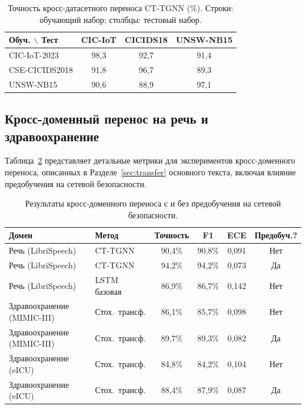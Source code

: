 \begin{table}[htbp]
\centering
\caption{Точность кросс-датасетного переноса CT-TGNN (\%). Строки: обучающий набор; столбцы: тестовый набор.}
\label{tab:app_transfer}
\begin{tabular}{lccc}
\toprule
Обуч. $\backslash$ Тест & CIC-IoT & CICIDS18 & UNSW-NB15 \\
\midrule
CIC-IoT-2023   & 98,3 & 92,7 & 91,4 \\
CSE-CICIDS2018 & 91,8 & 96,7 & 89,3 \\
UNSW-NB15      & 90,6 & 88,9 & 97,1 \\
\bottomrule
\end{tabular}
\end{table}


\subsection{Кросс-доменный перенос на речь и здравоохранение}
\label{app:cross_domain_detail}

Таблица~\ref{tab:app_cross_domain} представляет детальные метрики для экспериментов кросс-доменного переноса, описанных в Разделе~\ref{sec:transfer} основного текста, включая влияние предобучения на сетевой безопасности.

\begin{table}[htbp]
\centering
\caption{Результаты кросс-доменного переноса с и без предобучения на сетевой безопасности.}
\label{tab:app_cross_domain}
\begin{tabular}{llcccc}
\toprule
Домен & Метод & Точность & F1 & ECE & Предобуч.? \\
\midrule
Речь (LibriSpeech) & CT-TGNN & 90,4\% & 90,8\% & 0,091 & Нет \\
Речь (LibriSpeech) & CT-TGNN & 94,2\% & 94,2\% & 0,073 & Да \\
Речь (LibriSpeech) & LSTM базовая & 86,9\% & 86,7\% & 0,142 & Нет \\
\midrule
Здравоохранение (MIMIC-III) & Стох.\ трансф. & 86,1\% & 85,7\% & 0,098 & Нет \\
Здравоохранение (MIMIC-III) & Стох.\ трансф. & 89,7\% & 89,3\% & 0,082 & Да \\
Здравоохранение (eICU) & Стох.\ трансф. & 84,8\% & 84,2\% & 0,104 & Нет \\
Здравоохранение (eICU) & Стох.\ трансф. & 88,4\% & 87,9\% & 0,087 & Да \\
\bottomrule
\end{tabular}
\end{table}


